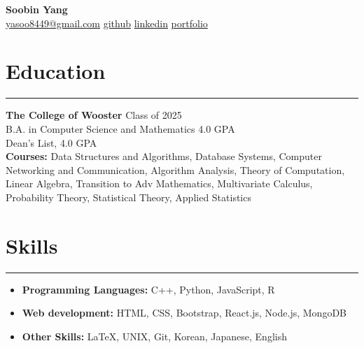 \documentclass[a4paper,12pt]{article}
\begin{document}
\linespread{1}\selectfont
{}
\newcommand{\sectionrule}[1]{
  \vspace{-15pt}
  \section*{\normalfont #1}
  \vspace{-10pt}
  \hrule
  \vspace{5pt}
}
\pagestyle{empty}

\begin{center}
    \textbf{\LARGE Soobin Yang}\\
    \vspace{5pt}
    \faEnvelope \hspace{1pt} \href{mailto:yasoo8449@gmail.com}{yasoo8449@gmail.com} \hspace{5pt}
    \faGithubSquare \hspace{1pt} \href{https://github.com/uliba3}{github} \hspace{5pt}
    \faLinkedinSquare \hspace{1pt} \href{https://linkedin.com/in/soobinyang8449}{linkedin}
    \faGlobe \hspace{1pt} \href{https://uliba3.github.io/portfolio/}{portfolio}
\end{center}

\vspace{-20pt}

\sectionrule{Education}
\textbf{\large The College of Wooster} \hfill \textnormal{Class of 2025}\\
\textnormal{B.A. in Computer Science and Mathematics} \hfill \textnormal{4.0 GPA}\\
\textnormal{Dean's List, 4.0 GPA}\\
\textbf{Courses:} Data Structures and Algorithms, Database Systems, Computer Networking and Communication, Algorithm Analysis, Theory of Computation, Linear Algebra, Transition to Adv Mathematics, Multivariate Calculus, Probability Theory, Statistical Theory, Applied Statistics


\sectionrule{Skills}
\begin{itemize}
    \item \textbf{Programming Languages:} C++, Python, JavaScript, R
    \item \textbf{Web development:} HTML, CSS, Bootstrap, React.js, Node.js, MongoDB
    \item \textbf{Other Skills:} LaTeX, UNIX, Git, Korean, Japanese, English
\end{itemize}
\end{document}
